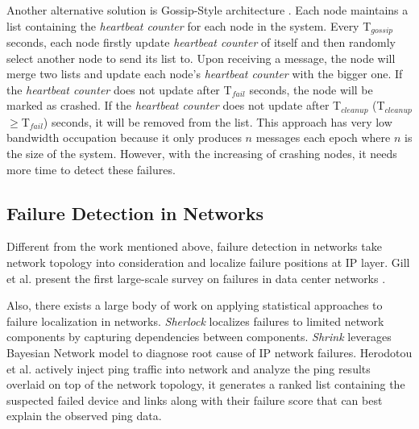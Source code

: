 \documentclass{sig-alternate-05-2015}
\begin{document}
Another alternative solution is Gossip-Style architecture \cite{van1998gossip}. Each node maintains a list containing the \textit{heartbeat counter} for each node in the system. Every T$_{gossip}$ seconds, each node firstly update \textit{heartbeat counter} of itself and then randomly select another node to send its list to. Upon receiving a message, the node will merge two lists and update each node's \textit{heartbeat counter} with the bigger one. If the \textit{heartbeat counter} does not update after T$_{fail}$ seconds, the node will be marked as crashed. If the \textit{heartbeat counter} does not update after T$_{cleanup}$ (T$_{cleanup}$
$\ge$T$_{fail}$) seconds, it will be removed from the list. This approach has very low bandwidth occupation because it only produces $n$ messages each epoch where $n$ is the size of the system. However, with the increasing of crashing nodes, it needs more time to detect these failures.

\subsection{Failure Detection in Networks}
Different from the work mentioned above, failure detection in networks take network topology into consideration and localize failure positions at IP layer. Gill et al. present the first large-scale survey on failures in data center networks \cite{gill2011understanding}.

Also, there exists a large body of work on applying statistical approaches to failure localization in networks. \textit{Sherlock} \cite{bahl2007towards} localizes failures to limited network components by capturing dependencies between components. \textit{Shrink} \cite{kandula2005shrink} leverages Bayesian Network model to diagnose root cause of IP network failures. Herodotou et al. \cite{herodotou2014scalable} actively inject ping traffic into network and analyze the ping results overlaid on top of the network topology, it generates a ranked list containing the suspected failed device and links along with their failure score that can best explain the observed ping data.
\end{document}
